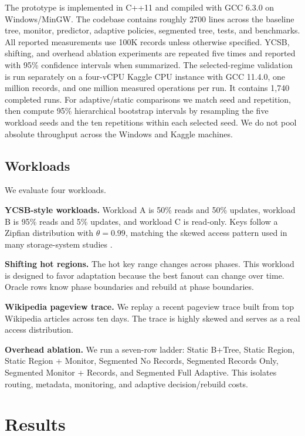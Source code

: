 \documentclass[sigconf,screen]{acmart}
\begin{document}
The prototype is implemented in C++11 and compiled with GCC 6.3.0 on
Windows/MinGW.  The codebase contains roughly 2700 lines across the baseline
tree, monitor, predictor, adaptive policies, segmented tree, tests, and
benchmarks.  All reported measurements use 100K records unless otherwise
specified.  YCSB, shifting, and overhead ablation experiments are repeated
five times and reported with 95\% confidence intervals when summarized.
The selected-regime validation is run separately on a four-vCPU Kaggle CPU
instance with GCC 11.4.0, one million records, and one million measured
operations per run.  It contains 1,740 completed runs.  For adaptive/static
comparisons we match seed and repetition, then compute 95\% hierarchical
bootstrap intervals by resampling the five workload seeds and the ten
repetitions within each selected seed.  We do not pool absolute throughput
across the Windows and Kaggle machines.

\subsection{Workloads}

We evaluate four workloads.

\textbf{YCSB-style workloads.}  Workload A is 50\% reads and 50\% updates,
workload B is 95\% reads and 5\% updates, and workload C is read-only.  Keys
follow a Zipfian distribution with \(\theta=0.99\), matching the skewed access
pattern used in many storage-system studies \cite{cooper2010benchmarking}.

\textbf{Shifting hot regions.}  The hot key range changes across phases.  This
workload is designed to favor adaptation because the best fanout can change
over time.  Oracle rows know phase boundaries and rebuild at phase boundaries.

\textbf{Wikipedia pageview trace.}  We replay a recent pageview trace built
from top Wikipedia articles across ten days.  The trace is highly skewed and
serves as a real access distribution.

\textbf{Overhead ablation.}  We run a seven-row ladder: Static B+Tree, Static
Region, Static Region + Monitor, Segmented No Records, Segmented Records Only,
Segmented Monitor + Records, and Segmented Full Adaptive.  This isolates
routing, metadata, monitoring, and adaptive decision/rebuild costs.

\section{Results}
\end{document}
